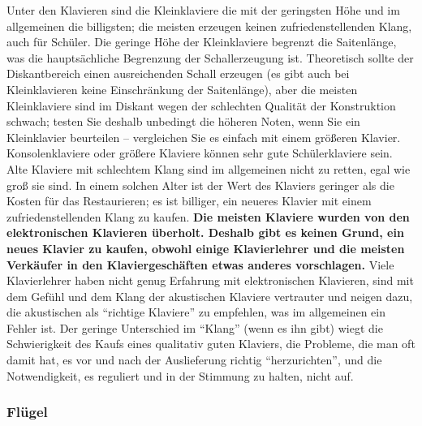 Unter den Klavieren sind die Kleinklaviere die mit der geringsten Höhe und im allgemeinen die billigsten; die meisten erzeugen keinen zufriedenstellenden Klang, auch für Schüler.
Die geringe Höhe der Kleinklaviere begrenzt die Saitenlänge, was die hauptsächliche Begrenzung der Schallerzeugung ist.
Theoretisch sollte der Diskantbereich einen ausreichenden Schall erzeugen (es gibt auch bei Kleinklavieren keine Einschränkung der Saitenlänge), aber die meisten Kleinklaviere sind im Diskant wegen der schlechten Qualität der Konstruktion schwach; testen Sie deshalb unbedingt die höheren Noten, wenn Sie ein Kleinklavier beurteilen -- vergleichen Sie es einfach mit einem größeren Klavier.
Konsolenklaviere oder größere Klaviere können sehr gute Schülerklaviere sein.
Alte Klaviere mit schlechtem Klang sind im allgemeinen nicht zu retten, egal wie groß sie sind.
In einem solchen Alter ist der Wert des Klaviers geringer als die Kosten für das Restaurieren; es ist billiger, ein neueres Klavier mit einem zufriedenstellenden Klang zu kaufen.
\textbf{Die meisten Klaviere wurden von den elektronischen Klavieren überholt.
Deshalb gibt es keinen Grund, ein neues Klavier zu kaufen, obwohl einige Klavierlehrer und die meisten Verkäufer in den Klaviergeschäften etwas anderes vorschlagen.}
Viele Klavierlehrer haben nicht genug Erfahrung mit elektronischen Klavieren, sind mit dem Gefühl und dem Klang der akustischen Klaviere vertrauter und neigen dazu, die akustischen als \enquote{richtige Klaviere} zu empfehlen, was im allgemeinen ein Fehler ist.
Der geringe Unterschied im \enquote{Klang} (wenn es ihn gibt) wiegt die Schwierigkeit des Kaufs eines qualitativ guten Klaviers, die Probleme, die man oft damit hat, es vor und nach der Auslieferung richtig \enquote{herzurichten}, und die Notwendigkeit, es reguliert und in der Stimmung zu halten, nicht auf.


\subsubsection{Flügel}
\label{c1iii17d}

